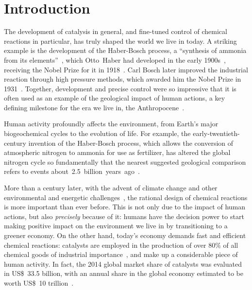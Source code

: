 \chapter*{Introduction}%
\label{ch:introduction}

The development of catalysis in general, and fine-tuned control of chemical reactions in particular,
has truly shaped the world we live in today.
A striking example is the development of the Haber-Bosch process,
a ``synthesis of ammonia from its elements''~\cite{Nobel_1918},
which Otto~Haber had developed in the early 1900s~\cite{Erisman_2008,Lewis_2015},
receiving the Nobel Prize for it in 1918~\cite{Nobel_1918}.
Carl Bosch later improved the industrial reaction through high pressure methods,
which awarded him the Nobel Prize in 1931~\cite{Nobel_1931}.
Together, development and precise control were so impressive that it is often used
as an example of the geological impact of human actions, a key defining milestone for
the era we live in, the Anthropocene~\cite{Smil_1999,Canfield_2010,Lewis_2015}.
%
\begin{citacao}
	Human activity profoundly affects the environment,
	from Earth’s major biogeochemical cycles to the evolution of life.
	For example, the early-twentieth-century invention of the Haber-Bosch process,
	which allows the conversion of atmospheric nitrogen to ammonia for use as fertilizer,
	has altered the global nitrogen cycle so fundamentally
	that the nearest suggested geological comparison refers to events
	about~2.5~billion~years~ago~\cite{Lewis_2015}.
\end{citacao}

More than a century later,
with the advent of climate change and other environmental and energetic challenges~\cite{Bertozzi_2016},
the rational design of chemical reactions is more important than ever before.
This is not only due to the impact of human actions,
but also \emph{precisely} because of it:
humans have the decision power to start making positive impact on the environment we live in
by transitioning to a greener economy.
On the other hand, today's economy demands fast and efficient chemical reactions:
catalysts are employed in the production of over 80\% of all chemical
goods of industrial
importance~\cite{Breakthrough_Catalyst,GlobalCatalystMarket},
and make up a considerable piece of human activity.
In fact, the 2014 global market share of catalysts was evaluated in US\$~33.5 billion,
with an annual share in the global economy estimated to be worth US\$~10
trillion~\cite{GlobalCatalystMarket}.

